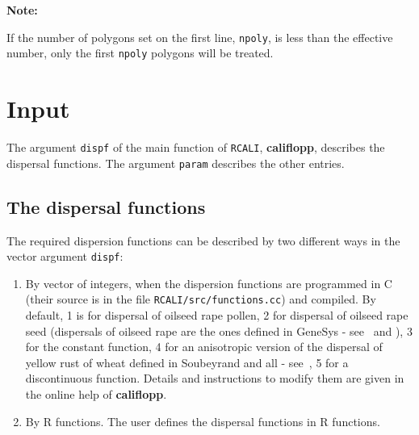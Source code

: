 \documentclass[a4paper,twoside,openright]{report}
\begin{document}
\textbf{Note:}

If the number of polygons set on the first line, \texttt{npoly},
is less than the effective number, only the 
first \texttt{npoly} polygons will be treated.


\chapter{Input}
\label{input}
The argument \texttt{dispf} of the main function of \verb+RCALI+, \textbf{califlopp}, describes the dispersal functions.
The argument \texttt{param}  describes the other entries.

\section{The dispersal functions}
The required dispersion functions can be described by two different ways in the vector  argument \texttt{dispf}:
\begin{enumerate}
\item
By vector of integers, when the dispersion functions are programmed
in C (their source is  in the file \texttt{RCALI/src/functions.cc}) and
compiled.
By default, 1 is for dispersal of oilseed rape pollen, 2 for dispersal of oilseed rape seed (dispersals of oilseed rape are the ones defined in GeneSys - see~\cite{Colbach1:2001} and \cite{Colbach2:2001}), 3 for the constant function, 4 for an anisotropic version of the dispersal of yellow rust of wheat defined in Soubeyrand and all -
see~\cite{Papaix:2011}, 5 for a discontinuous function.
Details and instructions to modify them are given in the online help of \textbf{califlopp}.
\item
By R functions. The user defines the dispersal functions  in R functions.
\end{enumerate}
\end{document}
